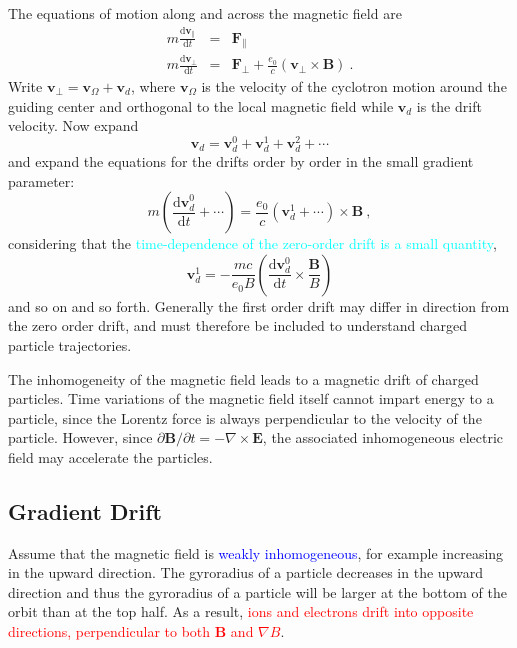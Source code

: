 \documentclass[12pt,a4paper]{article}
\renewcommand{\vec}[1]{\boldsymbol{#1}}
\newcommand{\dif}{\mathrm{d}}
\begin{document}
The equations of motion along and across the magnetic field are
\begin{eqnarray}
\nonumber m\frac{\dif \vec{v}_\parallel}{\dif t} &=& \vec{F}_\parallel \\
m\frac{\dif \vec{v}_\perp}{\dif t} &=& \vec{F}_\perp +\frac{e_0}{c} (\vec{v}_\perp \times \vec{B}) ~.
\end{eqnarray}
Write $\vec{v}_\perp = \vec{v}_\Omega + \vec{v}_d$, where $\vec{v}_\Omega$ is the velocity of the cyclotron motion around the guiding center and orthogonal to the local magnetic field while $\vec{v}_d$ is the drift velocity. Now expand
\begin{equation*}
\vec{v}_d = \vec{v}^0_d +\vec{v}^1_d +\vec{v}^2_d +\cdots 
\end{equation*}
and expand the equations for the drifts order by order in the small gradient parameter:
\begin{equation}
m\left(\frac{\dif \vec{v}^0_d}{\dif t} + \cdots\right) = \frac{e_0}{c} (\vec{v}^1_d +\cdots ) \times \vec{B} ~,
\end{equation}
considering that the \textcolor{cyan}{time-dependence of the zero-order drift is a small quantity},
\begin{equation*}
\vec{v}^1_d = -\frac{mc}{e_0 B} \left(\frac{\dif \vec{v}^0_d}{\dif t} \times \frac{\vec{B}}{B} \right)
\end{equation*}
and so on and so forth. Generally the first order drift may differ in direction from the zero order drift, and must therefore be included to understand charged particle trajectories.

\cite{1996bspp.book.....B} The inhomogeneity of the magnetic field leads to a magnetic drift of charged particles. Time variations of the magnetic field itself cannot impart energy to a particle, since the Lorentz force is always perpendicular to the velocity of the particle. However, since $\partial \vec{B}/\partial t = -\nabla \times \vec{E}$, the associated inhomogeneous electric field may accelerate the particles.

\subsection{Gradient Drift}
\cite{1996bspp.book.....B} Assume that the magnetic field is \textcolor{blue}{weakly inhomogeneous}, for example increasing in the upward direction. The gyroradius of a particle decreases in the upward direction and thus the gyroradius of a particle will be larger at the bottom of the orbit than at the top half. As a result, \textcolor{red}{ions and electrons drift into opposite directions, perpendicular to both $\vec{B}$ and $\nabla B$}.
\end{document}
